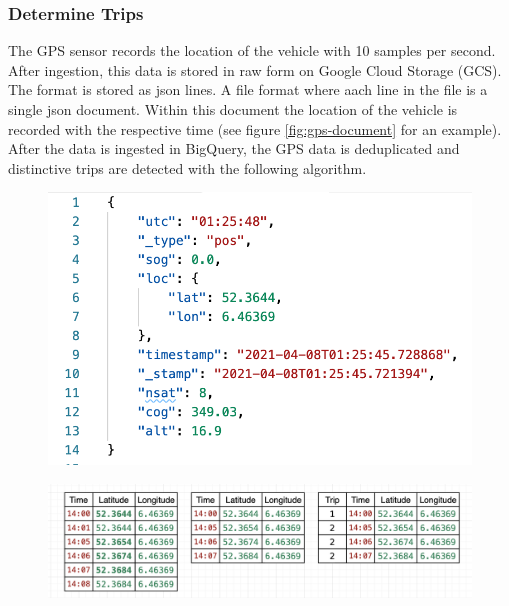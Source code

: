 \subsubsection{Determine Trips}
The GPS sensor records the location of the vehicle with 10 samples per second. After ingestion, this data is stored in raw form on Google Cloud Storage (GCS). The format is stored as json lines. A file format where aach line in the file is a single json document. Within this document the location of the vehicle is recorded with the respective time (see figure \ref{fig:gps-document} for an example). After the data is ingested in BigQuery, the GPS data is deduplicated and distinctive trips are detected with the following algorithm.

\begin{figure}[H]
\centering
\begin{minipage}{.35\textwidth}
  \centering
  \includegraphics[width=\linewidth]{images/4_data/gps-example.png}
  \label{fig:gps-document}
\end{minipage}%
\qquad
\begin{minipage}{.6\textwidth}
  \centering
  \includegraphics[width=\linewidth]{images/4_data/trip-detection.png}
  \label{fig:test2}
\end{minipage}
\end{figure}


